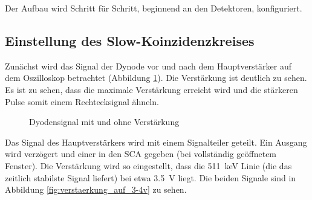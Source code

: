Der Aufbau wird Schritt für Schritt, beginnend an den Detektoren, konfiguriert. 
\subsection{Einstellung des Slow-Koinzidenzkreises}
Zunächst wird das Signal der Dynode vor und nach dem Hauptverstärker auf dem Oszilloskop betrachtet (Abbildung \ref{fig:slow_mit_und_ohne_verstaerkung}). Die Verstärkung ist deutlich zu sehen. Es ist zu sehen, dass die maximale Verstärkung erreicht wird und die stärkeren Pulse somit einem Rechtecksignal ähneln.

\begin{figure}[h]
  \centering
  \caption{Dyodensignal mit und ohne Verstärkung}
  \label{fig:slow_mit_und_ohne_verstaerkung}
\end{figure}
Das Signal des Hauptverstärkers wird mit einem Signalteiler geteilt. Ein Ausgang wird verzögert und einer in den SCA gegeben (bei vollständig geöffnetem Fenster). Die Verstärkung wird so eingestellt, dass die \SI{511}{\kilo\electronvolt} Linie (die das zeitlich stabilste Signal liefert) bei etwa \SI{3.5}{\volt} liegt. Die beiden Signale sind in Abbildung \ref{fig:verstaerkung_auf_3-4v} zu sehen.
